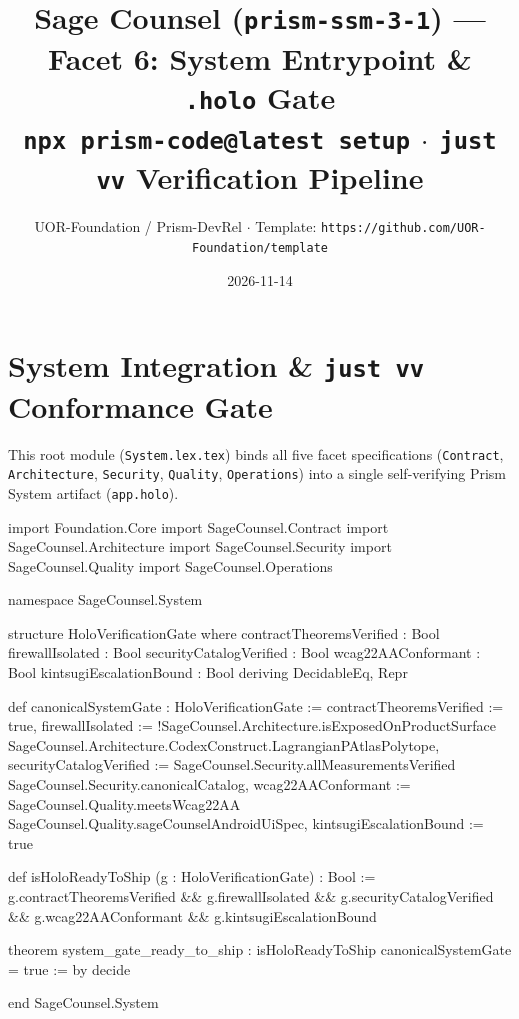 \documentclass[11pt,a4paper]{article}
\title{Sage Counsel (\texttt{prism-ssm-3-1}) --- Facet 6: System Entrypoint \& \texttt{.holo} Gate\\
\small \texttt{npx prism-code@latest setup} $\cdot$ \texttt{just vv} Verification Pipeline}
\author{UOR-Foundation / Prism-DevRel $\cdot$ Template: \texttt{https://github.com/UOR-Foundation/template}}
\date{2026-11-14}
\begin{document}
\maketitle

\section{System Integration \& \texttt{just vv} Conformance Gate}
This root module (\texttt{System.lex.tex}) binds all five facet specifications (\texttt{Contract}, \texttt{Architecture}, \texttt{Security}, \texttt{Quality}, \texttt{Operations}) into a single self-verifying Prism System artifact (\texttt{app.holo}).

\begin{code}
import Foundation.Core
import SageCounsel.Contract
import SageCounsel.Architecture
import SageCounsel.Security
import SageCounsel.Quality
import SageCounsel.Operations

namespace SageCounsel.System

structure HoloVerificationGate where
  contractTheoremsVerified : Bool
  firewallIsolated         : Bool
  securityCatalogVerified  : Bool
  wcag22AAConformant       : Bool
  kintsugiEscalationBound  : Bool
  deriving DecidableEq, Repr

def canonicalSystemGate : HoloVerificationGate :=
  { contractTheoremsVerified := true,
    firewallIsolated         := !SageCounsel.Architecture.isExposedOnProductSurface
                                  SageCounsel.Architecture.CodexConstruct.LagrangianPAtlasPolytope,
    securityCatalogVerified  := SageCounsel.Security.allMeasurementsVerified
                                  SageCounsel.Security.canonicalCatalog,
    wcag22AAConformant       := SageCounsel.Quality.meetsWcag22AA
                                  SageCounsel.Quality.sageCounselAndroidUiSpec,
    kintsugiEscalationBound  := true }

def isHoloReadyToShip (g : HoloVerificationGate) : Bool :=
  g.contractTheoremsVerified &&
  g.firewallIsolated &&
  g.securityCatalogVerified &&
  g.wcag22AAConformant &&
  g.kintsugiEscalationBound

theorem system_gate_ready_to_ship :
    isHoloReadyToShip canonicalSystemGate = true := by
  decide

end SageCounsel.System
\end{code}
\end{document}
